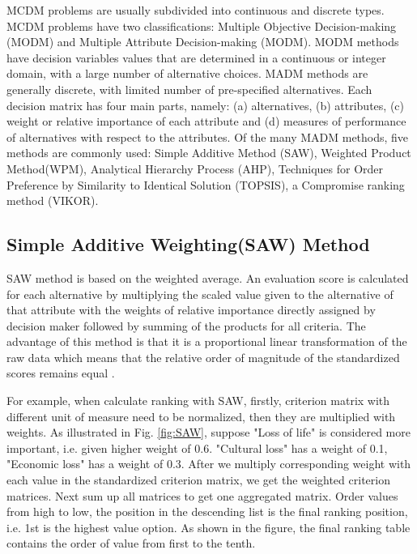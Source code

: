 MCDM problems are usually subdivided into continuous and discrete types. MCDM problems have two classifications: Multiple Objective Decision-making (MODM) and Multiple Attribute Decision-making (MODM). MODM methods have decision variables values that are determined in a continuous or integer domain, with a large number of alternative choices. MADM methods are generally discrete, with limited number of pre-specified alternatives. Each decision matrix has four main parts, namely: (a) alternatives, (b) attributes, (c) weight or relative importance of each attribute and (d) measures of performance of alternatives with respect to the attributes\cite{MCDM}. 
Of the many MADM methods, five methods are commonly used: Simple Additive Method (SAW), Weighted Product Method(WPM), Analytical Hierarchy Process (AHP), Techniques for Order Preference by Similarity to Identical Solution (TOPSIS), a Compromise ranking method (VIKOR).

\subsection{Simple Additive Weighting(SAW) Method}
SAW method is based on the weighted average. An evaluation score is calculated for each alternative by multiplying the scaled value given to the alternative of that attribute with the weights of relative importance directly assigned by decision maker followed by summing of the products for all criteria. The advantage of this method is that it is a proportional linear transformation of the raw data which means that the relative order of magnitude of the standardized scores remains equal \cite{SAW}. 

For example, when calculate ranking with SAW, firstly,
criterion matrix with different unit of measure need to be normalized,
then they are multiplied with weights.
As illustrated in Fig. \ref{fig:SAW}, suppose "Loss of life" is considered more important, i.e. given higher weight of 0.6.
"Cultural loss" has a weight of 0.1, "Economic loss" has a weight of 0.3.
After we multiply corresponding weight with each value in the standardized criterion matrix, we get the weighted criterion matrices.
Next sum up all matrices to get one aggregated matrix.
Order values from high to low, the position in the descending list is the final
ranking position, i.e. 1st is the highest value option. As shown in the figure,
the final ranking table contains the order of value from first to the tenth.

